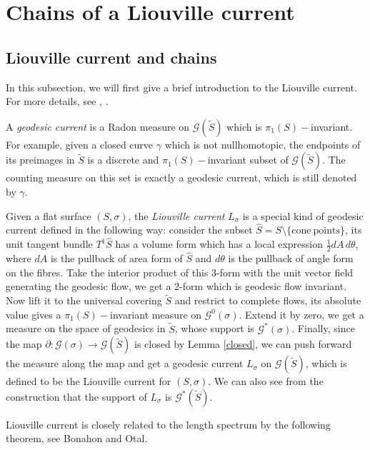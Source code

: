 \documentclass[reqno]{amsart}
\theoremstyle{plain}
\theoremstyle{definition}
\theoremstyle{remark}
\theoremstyle{definition}
\newcommand{\?}{\textcolor{red}{?}}
\newcommand{\Gsigma}{\mathcal{G}(\sigma) }
\newcommand{\Gosigma}{\mathcal{G}^0(\sigma) }
\newcommand{\Gssigma}{\mathcal{G}^*(\sigma) }
\newcommand{\Gs}{\mathcal{G}(\tilde{S}) }
\newcommand{\Gss}{\mathcal{G}^*(\tilde{S}) }
\begin{document}
\section{Chains of a Liouville current}

\subsection{Liouville current and chains}\label{computation_section}

In this subsection, we will first give a brief introduction to the Liouville current. For more details, see \cite[]{martelli2016introduction}, \cite[]{frazier2012length}.

A \textit{geodesic current} is a Radon measure on $\mathcal{G}(\tilde{S})$ which is $\pi_1(S)-$invariant. For example, given a closed curve $\gamma$ which is not nullhomotopic, the endpoints of its preimages in $\tilde{S}$ is a discrete and $\pi_1(S)-$invariant subset of $\mathcal{G}(\tilde{S})$. The counting measure on this set is exactly a geodesic current, which is still denoted by $\gamma$. 

Given a flat surface $(S,\sigma)$, the \textit{Liouville current} $L_\sigma$ is a special kind of geodesic current defined in the following way: consider the subset $\hat{S} = S \setminus \{\mathrm{cone\ points}\}$, its unit tangent bundle $T^1\hat{S}$ has a volume form which has a local expression $\frac{1}{2} dA\,d\theta$, where $dA$ is the pullback of area form of $\hat{S}$ and $d\theta$ is the pullback of angle form on the fibres. Take the interior product of this 3-form with the unit vector field generating the geodesic flow, we get a 2-form which is geodesic flow invariant. Now lift it to the universal covering $\tilde{S}$ and restrict to complete flows, its absolute value gives a $\pi_1(S)-$invariant measure on $\Gosigma$. Extend it by zero, we get a measure on the space of geodesics in $\tilde{S}$, whose support is $\Gssigma$. Finally, since the map $\partial:\Gsigma\to\Gs$ is closed by Lemma \ref{closed}, we can push forward the measure along the map and get a geodesic current $L_\sigma$ on $\mathcal{G}(\tilde{S})$, which is defined to be the Liouville current for $(S,\sigma)$. We can also see from the construction that the support of $L_\sigma$ is $\Gss$.

\iffalse
Liouville current is closely related to the length spectrum by the following theorem, see Bonahon\cite{bonahon1988geometry} and Otal\cite{otal1990spectre}.
\end{document}
